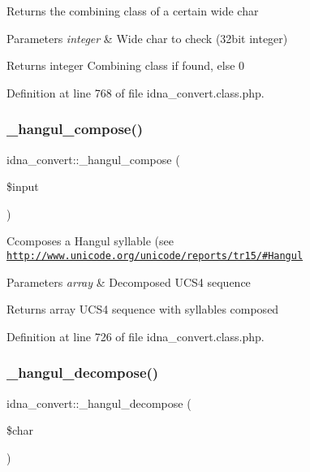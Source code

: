 Returns the combining class of a certain wide char 
\begin{DoxyParams}{Parameters}
{\em integer} & Wide char to check (32bit integer) \\
\hline
\end{DoxyParams}
\begin{DoxyReturn}{Returns}
integer Combining class if found, else 0 
\end{DoxyReturn}


Definition at line 768 of file idna\+\_\+convert.\+class.\+php.

\mbox{\label{classidna__convert_a33124ab535f6739a2a5e6fa46c532d28}} 
\subsubsection{\texorpdfstring{\+\_\+hangul\+\_\+compose()}{\_hangul\_compose()}}
{\footnotesize\ttfamily idna\+\_\+convert\+::\+\_\+hangul\+\_\+compose (\begin{DoxyParamCaption}\item[{}]{\$input }\end{DoxyParamCaption})\hspace{0.3cm}{\ttfamily [protected]}}

Ccomposes a Hangul syllable (see \href{http://www.unicode.org/unicode/reports/tr15/#Hangul}{\tt http\+://www.\+unicode.\+org/unicode/reports/tr15/\#\+Hangul} 
\begin{DoxyParams}{Parameters}
{\em array} & Decomposed U\+C\+S4 sequence \\
\hline
\end{DoxyParams}
\begin{DoxyReturn}{Returns}
array U\+C\+S4 sequence with syllables composed 
\end{DoxyReturn}


Definition at line 726 of file idna\+\_\+convert.\+class.\+php.

\mbox{\label{classidna__convert_a9cc5a89053729bb98d2a0ecf143b2b2c}} 
\subsubsection{\texorpdfstring{\+\_\+hangul\+\_\+decompose()}{\_hangul\_decompose()}}
{\footnotesize\ttfamily idna\+\_\+convert\+::\+\_\+hangul\+\_\+decompose (\begin{DoxyParamCaption}\item[{}]{\$char }\end{DoxyParamCaption})\hspace{0.3cm}{\ttfamily [protected]}}

